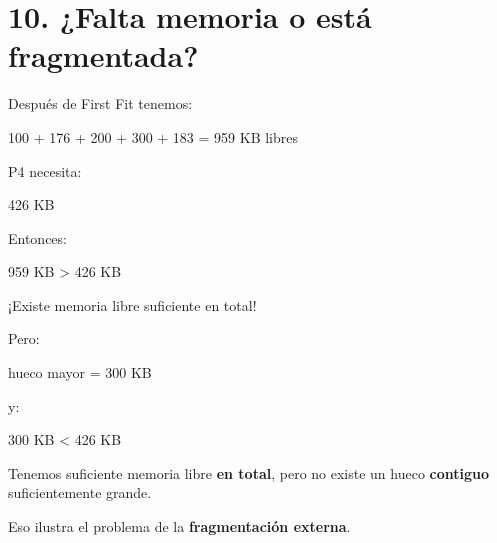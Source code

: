 \documentclass[
  spanish,
  letterpaper,
]{scrbook}
\newenvironment{Shaded}{\begin{snugshade}}{\end{snugshade}}
\newcommand{\NormalTok}[1]{\textcolor[rgb]{0.00,0.23,0.31}{#1}}
\begin{document}

\chapter{10. ¿Falta memoria o está
fragmentada?}\label{falta-memoria-o-estuxe1-fragmentada}

Después de First Fit tenemos:

\begin{Shaded}
\begin{Highlighting}[]
\NormalTok{100 + 176 + 200 + 300 + 183 = 959 KB libres}
\end{Highlighting}
\end{Shaded}

P4 necesita:

\begin{Shaded}
\begin{Highlighting}[]
\NormalTok{426 KB}
\end{Highlighting}
\end{Shaded}

Entonces:

\begin{Shaded}
\begin{Highlighting}[]
\NormalTok{959 KB \textgreater{} 426 KB}
\end{Highlighting}
\end{Shaded}

¡Existe memoria libre suficiente en total!

Pero:

\begin{Shaded}
\begin{Highlighting}[]
\NormalTok{hueco mayor = 300 KB}
\end{Highlighting}
\end{Shaded}

y:

\begin{Shaded}
\begin{Highlighting}[]
\NormalTok{300 KB \textless{} 426 KB}
\end{Highlighting}
\end{Shaded}

\begin{tcolorbox}[enhanced jigsaw, arc=.35mm, bottomrule=.15mm, bottomtitle=1mm, breakable, colback=white, colbacktitle=quarto-callout-important-color!10!white, colframe=quarto-callout-important-color-frame, coltitle=black, left=2mm, leftrule=.75mm, opacityback=0, opacitybacktitle=0.6, rightrule=.15mm, title=\textcolor{quarto-callout-important-color}{\faExclamation}\hspace{0.5em}{Este es el punto clave}, titlerule=0mm, toprule=.15mm, toptitle=1mm]

Tenemos suficiente memoria libre \textbf{en total}, pero no existe un
hueco \textbf{contiguo} suficientemente grande.

Eso ilustra el problema de la \textbf{fragmentación externa}.

\end{tcolorbox}
\end{document}

